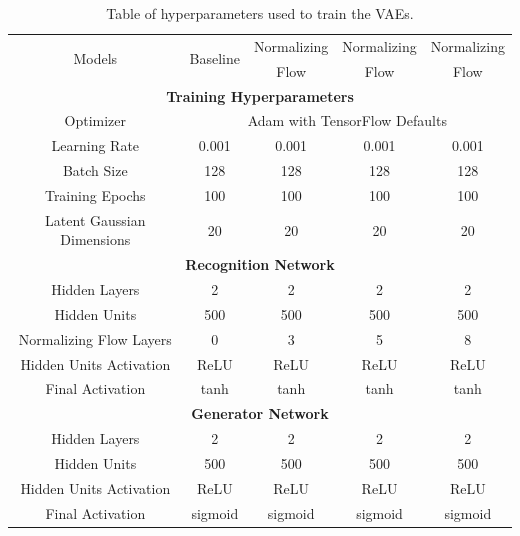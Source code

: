 \documentclass{article}
\begin{document}
\begin{table}[htbp]
\centering
\caption{Table of hyperparameters used to train the VAEs.}
\label{tab:hyperparameters}
	\begin{tabular}{|c||c|c|c|c|}\hline
	\multirow{2}{*}{Models}    & \multirow{2}{*}{Baseline} & Normalizing & Normalizing & Normalizing \\
	                       &               &       Flow     &          Flow       &           Flow           \\\hline\hline
	\multicolumn{5}{|c|}{\textbf{Training Hyperparameters}}			                  \\\hline
	Optimizer                  & \multicolumn{4}{|c|}{Adam with TensorFlow Defaults}                 \\\hline
	Learning Rate              & 0.001    & 0.001            & 0.001            & 0.001            \\\hline
	Batch Size                 & 128      & 128              & 128              & 128              \\\hline
	Training Epochs            & 100      & 100              & 100              & 100              \\\hline
	Latent Gaussian Dimensions & 20       & 20               & 20               & 20               \\\hline\hline
	\multicolumn{5}{|c|}{\textbf{Recognition Network}}                                                        \\\hline
	Hidden Layers              & 2        & 2                & 2                & 2                \\\hline
	Hidden Units               & 500      & 500              & 500              & 500              \\\hline
	Normalizing Flow Layers    & 0        & 3                & 5                & 8                \\\hline
	Hidden Units Activation    & ReLU     & ReLU             & ReLU             & ReLU             \\\hline
	Final Activation           & tanh     & tanh             & tanh             & tanh             \\\hline\hline
	\multicolumn{5}{|c|}{\textbf{Generator Network}}                                                          \\\hline
	Hidden Layers              & 2        & 2                & 2                & 2                \\\hline
	Hidden Units               & 500      & 500              & 500              & 500              \\\hline
	Hidden Units Activation    & ReLU     & ReLU             & ReLU             & ReLU             \\\hline
	Final Activation           & sigmoid  & sigmoid          & sigmoid          & sigmoid         \\\hline
	\end{tabular}
\end{table}
\end{document}
